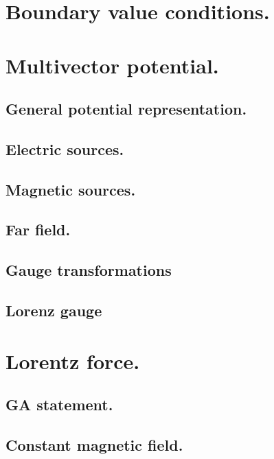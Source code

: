       \section{Boundary value conditions.}
         
      \section{Multivector potential.}
         \subsection{General potential representation.}
            
         \subsection{Electric sources.}
            
         \subsection{Magnetic sources.}
            
         \subsection{Far field.}
            
         \subsection{Gauge transformations}
            
         \subsection{Lorenz gauge}
            
      \section{Lorentz force.}
         \subsection{GA statement.}
            
         \subsection{Constant magnetic field.}
            
